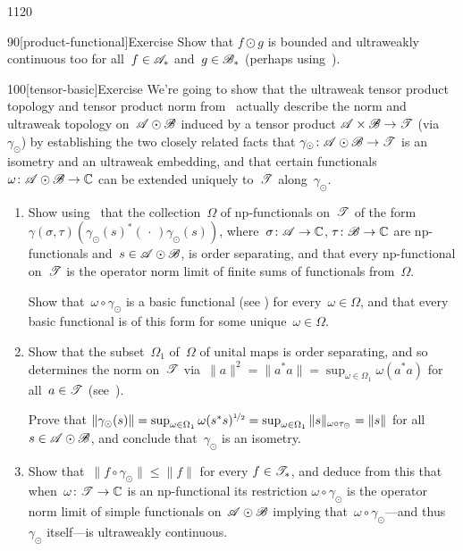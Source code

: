 \begin{parsec}{1120}
\begin{point}{90}[product-functional]{Exercise}
Show that $f\odot g$ is
bounded and ultraweakly continuous too
for all~$f\in\mathscr{A}_*$ and~$g\in\mathscr{B}_*$
(perhaps using~).
\end{point}
\begin{point}{100}[tensor-basic]{Exercise}%
We're going to show that 
the ultraweak tensor product topology
and tensor product norm from~
actually describe the norm and ultraweak topology
on~$\mathscr{A}\odot\mathscr{B}$ induced by a tensor product
$\mathscr{A}\times\mathscr{B}\to\mathscr{T}$ (via~$\gamma_\odot$)
by establishing
the two closely related facts that
$\gamma_\odot\colon\mathscr{A}\odot\mathscr{B}\to\mathscr{T}$
is an isometry
and an ultraweak embedding,
and that certain
functionals 
$\omega\colon \mathscr{A}\odot\mathscr{B}\to\mathbb{C}$
can be extended uniquely to~$\mathscr{T}$ along~$\gamma_\odot$.
\begin{enumerate}
\item
Show using~
that the collection~$\Omega$
of np-functionals
on~$\mathscr{T}$ of the form 
$\gamma(\sigma,\tau)(\gamma_\odot(s)^*(\,\cdot\,)\gamma_\odot(s))$,
where~$\sigma\colon \mathscr{A}\to\mathbb{C}$,
$\tau\colon \mathscr{B}\to\mathbb{C}$
are np-functionals
and~$s\in\mathscr{A}\odot\mathscr{B}$,
is order separating,
and that
every np-functional on~$\mathscr{T}$
is the operator norm limit of finite sums
of functionals from~$\Omega$.

Show that~$\omega\circ \gamma_\odot$ is a basic functional
(see )
for every~$\omega\in\Omega$,
and that every basic functional is of this form
for some unique~$\omega\in\Omega$.

\item
Show that the subset~$\Omega_1$ of~$\Omega$
of unital maps is order separating,
and so determines the norm on~$\mathscr{T}$
via~$\|a\|^2=\|a^*a\| = \sup_{\omega\in\Omega_1} \omega(a^*a)$
for all~$a\in\mathscr{T}$
(see~).

Prove that $\|\gamma_\odot(s)\|
=\sup_{\omega\in\Omega_1} \omega(s^*s)^{\nicefrac{1}{2}}
=\sup_{\omega\in\Omega_1}
\|s\|_{\omega\circ \tau_\odot}=\|s\|$
for all~$s\in\mathscr{A}\odot\mathscr{B}$,
and 
conclude
that~$\gamma_\odot$ is an isometry.

\item
Show that~$\|f\circ\gamma_\odot\|\leq \|f\|$
for every $f\in\mathscr{T}_*$,
and deduce from this
that when~$\omega\colon \mathscr{T}\to\mathbb{C}$
is an np-functional
its restriction $\omega\circ\gamma_\odot$
is the operator norm limit
of simple functionals on~$\mathscr{A}\odot\mathscr{B}$
implying that~$\omega\circ\gamma_\odot$---and
thus $\gamma_\odot$ itself---is ultraweakly continuous.


\end{enumerate}
\end{point}
\end{parsec}
